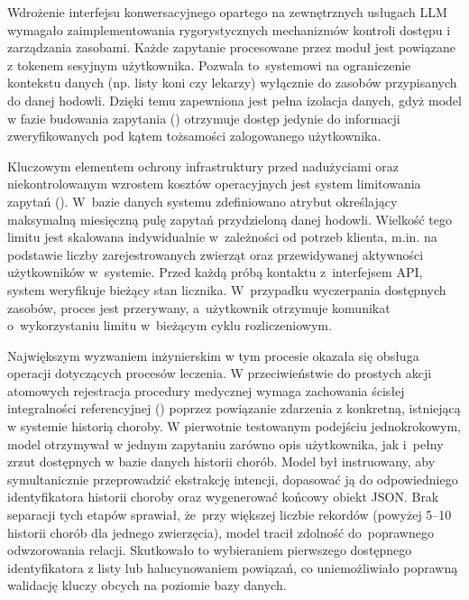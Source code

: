 Wdrożenie interfejsu konwersacyjnego opartego na zewnętrznych usługach LLM wymagało zaimplementowania rygorystycznych mechanizmów kontroli dostępu i zarządzania zasobami. Każde zapytanie procesowane przez moduł jest powiązane z tokenem sesyjnym użytkownika. Pozwala to~systemowi na ograniczenie kontekstu danych (np. listy koni czy lekarzy) wyłącznie do zasobów przypisanych do danej hodowli. Dzięki temu zapewniona jest pełna izolacja danych, gdyż model w fazie budowania zapytania () otrzymuje dostęp jedynie do informacji zweryfikowanych pod kątem tożsamości zalogowanego użytkownika.

Kluczowym elementem ochrony infrastruktury przed nadużyciami oraz niekontrolowanym wzrostem kosztów operacyjnych jest system limitowania zapytań (). W~bazie danych systemu zdefiniowano atrybut określający maksymalną miesięczną pulę zapytań przydzieloną danej hodowli. Wielkość tego limitu jest skalowana indywidualnie w~zależności od potrzeb klienta, m.in. na podstawie liczby zarejestrowanych zwierząt oraz przewidywanej aktywności użytkowników w~systemie. Przed każdą próbą kontaktu z~interfejsem API, system weryfikuje bieżący stan licznika. W~przypadku wyczerpania dostępnych zasobów, proces jest przerywany, a~użytkownik otrzymuje komunikat o~wykorzystaniu limitu w~bieżącym cyklu rozliczeniowym.

Największym wyzwaniem inżynierskim w tym procesie okazała się obsługa operacji dotyczących procesów leczenia. W przeciwieństwie do prostych akcji atomowych rejestracja procedury medycznej wymaga zachowania ścisłej integralności referencyjnej () poprzez powiązanie zdarzenia z konkretną, istniejącą w systemie historią choroby. W pierwotnie testowanym podejściu jednokrokowym, model otrzymywał w jednym zapytaniu zarówno opis użytkownika, jak i~pełny zrzut dostępnych w bazie danych historii chorób. Model był instruowany, aby symultanicznie przeprowadzić ekstrakcję intencji, dopasować ją do odpowiedniego identyfikatora historii choroby oraz wygenerować końcowy obiekt JSON. Brak separacji tych etapów sprawiał, że~przy większej liczbie rekordów (powyżej 5--10 historii chorób dla jednego zwierzęcia), model tracił zdolność do~poprawnego odwzorowania relacji. Skutkowało to wybieraniem pierwszego dostępnego identyfikatora z listy lub halucynowaniem powiązań, co uniemożliwiało poprawną walidację kluczy obcych na poziomie bazy danych.

